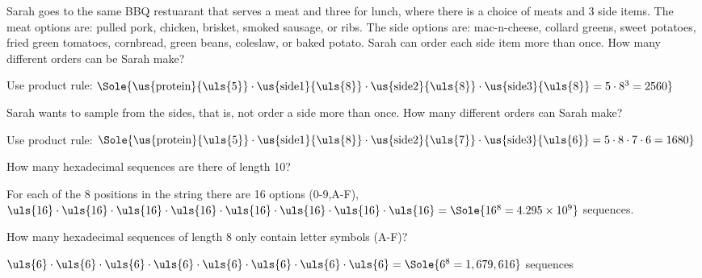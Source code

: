 \begin{questions}
 Sarah goes to the same BBQ restuarant that serves a meat and three for lunch, where there is a choice of meats and 3 side items.  The meat options are: pulled pork, chicken, brisket, smoked sausage, or ribs.  The side options are: mac-n-cheese, collard greens, sweet potatoes, fried green tomatoes, cornbread, green beans, coleslaw, or baked potato.  Sarah can order each side item more than once.  How many different orders can be Sarah make?  
  \ifprintanswers
    \vspace{-10pt}
  \fi
  \begin{solution}
  Use product rule: $\Sole{ \us{\text{protein}}{\uls{5}} \cdot 
    \us{\text{side1}}{\uls{8}} \cdot \us{\text{side2}}{\uls{8}} \cdot
    \us{\text{side3}}{\uls{8}} = 5\cdot8^3 = 2560} $
  \end{solution}


 Sarah wants to sample from the sides, that is, not order a side more than once.  How many different orders can Sarah make? 
  \ifprintanswers
    \vspace{-10pt}
  \fi
  \begin{solution}
  Use product rule: $\Sole{ \us{\text{protein}}{\uls{5}} \cdot 
    \us{\text{side1}}{\uls{8}} \cdot \us{\text{side2}}{\uls{7}} \cdot
    \us{\text{side3}}{\uls{6}} = 5\cdot8\cdot7\cdot6 = 1680} $
  \end{solution}





 How many hexadecimal sequences are there of length 10?
    \ifprintanswers
        \vspace{-10pt}
   \fi
    \begin{solution}
    For each of the 8 positions in the string there are 16 options (0-9,A-F), \\
    $\uls{16} \cdot \uls{16} \cdot \uls{16} \cdot \uls{16} \cdot 
      \uls{16} \cdot \uls{16} \cdot \uls{16} \cdot \uls{16}  = 
      \Sole{  16^{8}= 4.295 \times 10^{9} }$ sequences.
    \end{solution}


 How many hexadecimal sequences of length 8 only contain letter symbols (A-F)?
    \ifprintanswers
        \vspace{-10pt}
   \fi
    \begin{solution}
    $ \uls{6} \cdot \uls{6} \cdot \uls{6} \cdot \uls{6} \cdot 
      \uls{6} \cdot \uls{6} \cdot \uls{6} \cdot \uls{6} = 
      \Sole{  6^{8} = 1,679,616}$ sequences
    \end{solution}




\end{questions}
